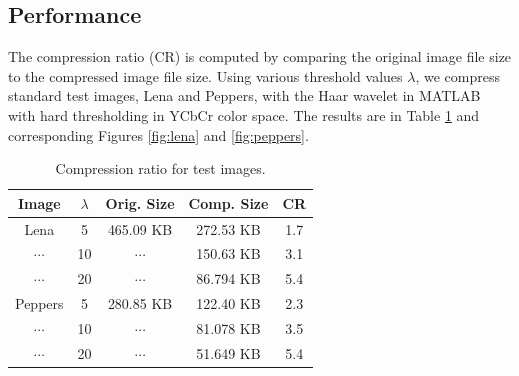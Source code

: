 \documentclass{article}
\theoremstyle{definition}
\begin{document}
  \subsection{Performance}
  The compression ratio (CR) is computed by comparing the original image file size to the compressed image file size. Using various threshold values \(\lambda\), we compress standard test images, Lena and Peppers, with the Haar wavelet in MATLAB with hard thresholding in YCbCr color space. The results are in Table \ref{tab:compression-ratio} and corresponding Figures
  \ref{fig:lena} and \ref{fig:peppers}.
  \begin{table}[ht]
    \centering
    \begin{tabular}{c|c|c|c|c}
      Image & \(\lambda\) & Orig. Size & Comp. Size & CR\\
      \hline
      Lena & 5 & 465.09 KB & 272.53 KB & 1.7\\
      $\cdots$ & 10 & $\cdots$ & 150.63 KB & 3.1\\
      $\cdots$ & 20 & $\cdots$ & 86.794 KB & 5.4\\
      \hline
      Peppers & 5 & 280.85 KB & 122.40 KB & 2.3\\
      $\cdots$ & 10 & $\cdots$ & 81.078 KB & 3.5\\
      $\cdots$ & 20 & $\cdots$ & 51.649 KB & 5.4
    \end{tabular}
    \caption{Compression ratio for test images.}
    \label{tab:compression-ratio}
  \end{table}

  \clearpage
\end{document}
